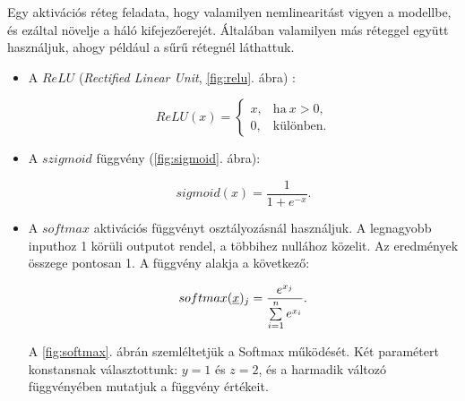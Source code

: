 
Egy aktivációs réteg feladata, hogy valamilyen nemlinearitást vigyen a modellbe, és ezáltal növelje a háló 
kifejezőerejét. Általában valamilyen más réteggel együtt használjuk, ahogy például a sűrű rétegnél láthattuk.


\begin{itemize}
	

	\item
	A $ ReLU $ (\textit{Rectified Linear Unit}, \ref{fig:relu}. ábra) :
	
	\[  ReLU(x) =  
	\begin{cases}
	x, & \text{ha}\ x > 0, \\
	0, & \text{különben}.
	\end{cases} 
	\]
	
	\item
	A $ szigmoid $ függvény (\ref{fig:sigmoid}. ábra):
		
	\[  sigmoid(x) = \dfrac{1}{1 + e^{-x}}  . \]
	
	
	

	
	\item
	A $ softmax $ aktivációs függvényt osztályozásnál használjuk. A legnagyobb inputhoz 1 körüli outputot rendel, a többihez nullához közelit. Az eredmények összege pontosan 1. A függvény alakja a következő:
	
	\[  softmax(\underline{x})_j = \dfrac{e^{x_j}}{\sum\limits_{{i}=1}^{n}e^{x_i}}  .\]
	
	A \ref{fig:softmax}. ábrán szemléltetjük a Softmax működését. Két paramétert konstansnak választottunk: $ y=1 $ és $ z=2 $, és a harmadik változó függvényében mutatjuk a függvény értékeit.
	
%		
%		
	\begin{figure} [h!]
		

\end{figure}
\end{itemize}
